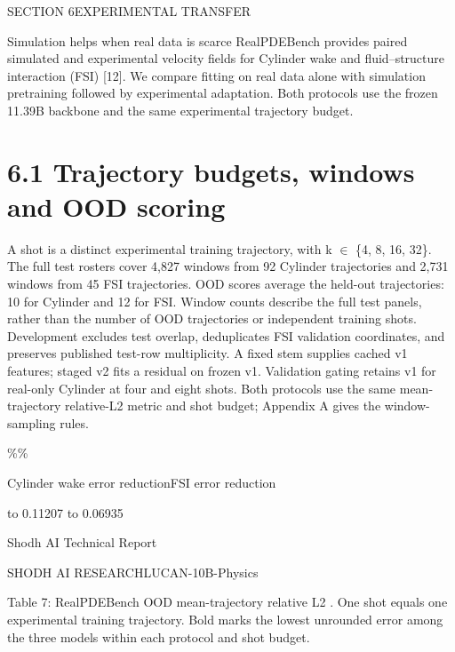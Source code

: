 \documentclass[11pt]{article}
\begin{document}
\noindent SECTION 6\quad EXPERIMENTAL TRANSFER\par


Simulation helps when real data is scarce
RealPDEBench provides paired simulated and experimental velocity fields for Cylinder wake
and fluid–structure interaction (FSI) [12]. We compare fitting on real data alone with
simulation pretraining followed by experimental adaptation. Both protocols use the frozen
11.39B backbone and the same experimental trajectory budget.

\section*{6.1 Trajectory budgets, windows and OOD scoring}

A shot is a distinct experimental training trajectory, with k \ensuremath{\in} \{4, 8, 16, 32\}. The full test
rosters cover 4,827 windows from 92 Cylinder trajectories and 2,731 windows from
45 FSI trajectories. OOD scores average the held-out trajectories: 10 for Cylinder and
12 for FSI. Window counts describe the full test panels, rather than the number of OOD
trajectories or independent training shots.
Development excludes test overlap, deduplicates FSI validation coordinates, and preserves
published test-row multiplicity. A fixed stem supplies cached v1 features; staged v2 fits a
residual on frozen v1. Validation gating retains v1 for real-only Cylinder at four and eight
shots. Both protocols use the same mean-trajectory relative-L2 metric and shot budget;
Appendix A gives the window-sampling rules.


\%\%\par


\noindent Cylinder wake error reduction\quad FSI error reduction\par


 to 0.11207 to 0.06935\par




\noindent Shodh AI Technical Report\par




\noindent SHODH AI RESEARCH\quad LUCAN-10B-Physics\par



Table 7: RealPDEBench OOD mean-trajectory relative L2 . One shot equals one experimental
training trajectory. Bold marks the lowest unrounded error among the three models within each
protocol and shot budget.
\end{document}
